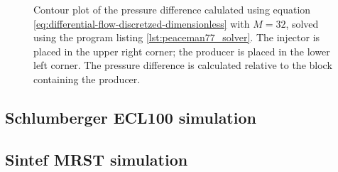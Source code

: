 \begin{figure}[H]
    \centering
    \scalebox{0.7}{}
    \caption{Contour plot of the pressure difference calulated using equation \eqref{eq:differential-flow-discretzed-dimensionless} with $M=32$, solved using the program listing \ref{lst:peaceman77_solver}. The injector is placed in the upper right corner; the producer is placed in the lower left corner. The pressure difference is calculated relative to the block containing the producer.}
    \label{fig:pressure_drop_contour}
\end{figure}






\subsection{Schlumberger ECL100 simulation} %
\label{sub:schlumberger_ecl100_simulation_results}





\subsection{Sintef MRST simulation} %
\label{sub:sintef_mrst_simulation}



